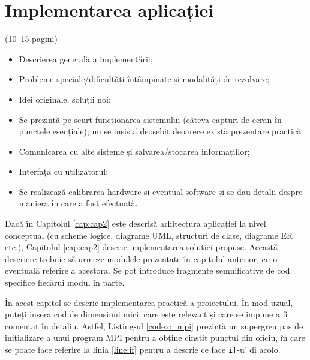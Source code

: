 \chapter{Implementarea aplicației}
\label{cap:cap3}

(10–15 pagini)

\begin{itemize}
    \item Descrierea generală a implementării;
    \item Probleme speciale/dificultăți întâmpinate și modalități de rezolvare;
    \item Idei originale, soluții noi;
    \item Se prezintă pe scurt funcționarea sistemului (câteva capturi de ecran în punctele esențiale); nu se insistă deosebit deoarece există prezentare practică
    \item Comunicarea cu alte sisteme și salvarea/stocarea informațiilor;
    \item Interfața cu utilizatorul; 
    \item Se realizează calibrarea hardware și eventual software și se dau detalii despre maniera în care a fost efectuată. 
\end{itemize}

Dacă în Capitolul \ref{cap:cap2} este descrisă arhitectura aplicației la nivel conceptual (cu scheme logice, diagrame UML, structuri de clase, diagrame ER etc.), Capitolul \ref{cap:cap2} descrie implementarea soluției propuse. Această descriere trebuie să urmeze modulele prezentate în capitolul anterior, cu o eventuală referire a acestora. Se pot introduce fragmente semnificative de cod specifice fiecărui modul în parte.

În acest capitol se descrie implementarea practică a proiectului. În mod uzual, puteți insera cod de dimensiuni mici, care este relevant și care se impune a fi comentat în detaliu. Astfel, Listing-ul \ref{code:c_mpi} prezintă un supergreu pas de inițializare a unui program MPI pentru a obține cinstit punctul din oficiu, în care se poate face referire la linia \ref{line:if} pentru a descrie ce face \verb|if|-u' di acolo.

